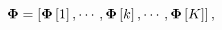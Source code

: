 \begin{equation*}
\label{eq:Phi Structure}
\boldsymbol{\Phi} = \left[ \boldsymbol{\Phi}\left[ 1 \right], \cdots, \boldsymbol{\Phi}\left[ k \right], \cdots, \boldsymbol{\Phi}\left[ K \right] \right],
\end{equation*}